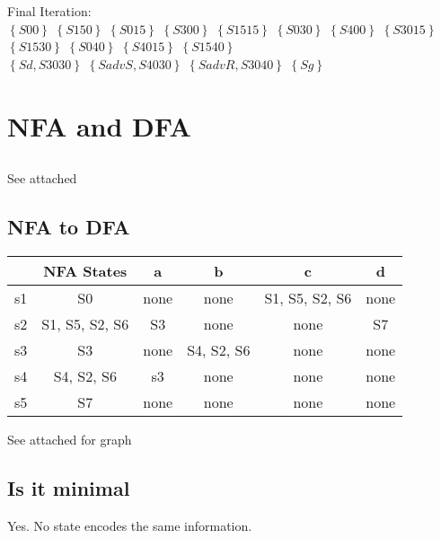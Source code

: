 \documentclass[11pt]{article}
\begin{document}
Final Iteration:\\
$\left\{
    {S00}
\right\}$
$\left\{
    {S150}
\right\}$
$\left\{
    {S015}
\right\}$
$\left\{
    {S300}
\right\}$
$\left\{
    {S1515}
\right\}$
$\left\{
    {S030}
\right\}$
$\left\{
    {S400}
\right\}$
$\left\{
    {S3015}
\right\}$
$\left\{
    {S1530}
\right\}$
$\left\{
    {S040}
\right\}$
$\left\{
    {S4015}
\right\}$
$\left\{
    {S1540}
\right\}$\\
$\left\{
    {Sd, S3030}
\right\}$
$\left\{
    {SadvS, S4030}
\right\}$
$\left\{
    {SadvR, S3040}
\right\}$
$\left\{
    {Sg}
\right\}$



\section{NFA and DFA}

\subsection{}

See attached

\subsection{NFA to DFA}
\begin{tabular}{| c | c | c | c | c | c |}
    \hline
    & NFA States & a & b & c & d\\
    \hline
    s1 & S0 & none & none & S1, S5, S2, S6 & none\\
    \hline
    s2 & S1, S5, S2, S6 & S3 & none & none & S7\\
    \hline
    s3 & S3 & none & S4, S2, S6 & none & none\\
    \hline
    s4 & S4, S2, S6 & s3 & none & none & none\\
    \hline
    s5 & S7 & none & none & none & none\\
    \hline
\end{tabular}

See attached for graph

\subsection{Is it minimal}
Yes. No state encodes the same information.
\end{document}
